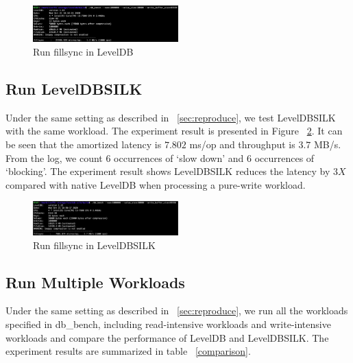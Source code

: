 \documentclass[letter,twocolumn,10pt]{article}
\begin{document}
\begin{figure}[H]
\centering
\includegraphics[width=0.5\textwidth]{./db_bench_leveldb.png}
\caption{Run fillsync in LevelDB}
\label{db_bench}
\end{figure}

\subsection {Run LevelDBSILK}
Under the same setting as described in ~\ref{sec:reproduce}, we test LevelDBSILK with the same workload. The experiment result is presented in Figure ~\ref{db_bench_1}. It can be seen that the amortized latency is $7.802$ ms/op and throughput is $3.7$ MB/s. From the log, we count $6$ occurrences of `slow down' and $6$ occurrences of `blocking'. The experiment result shows LevelDBSILK reduces the latency by $3X$ compared with native LevelDB when processing a pure-write workload.  

\begin{figure}[H]
\centering
\includegraphics[width=0.5\textwidth]{./db_bench_leveldbsilk.png}
\caption{Run fillsync in LevelDBSILK}
\label{db_bench_1}
\end{figure}

\subsection {Run Multiple Workloads}
Under the same setting as described in ~\ref{sec:reproduce}, we run all the workloads specified in \textsf{db\_bench}, including read-intensive workloads and write-intensive workloads and compare the performance of LevelDB and LevelDBSILK. The experiment results are summarized in table ~\ref{comparison}.
\end{document}
